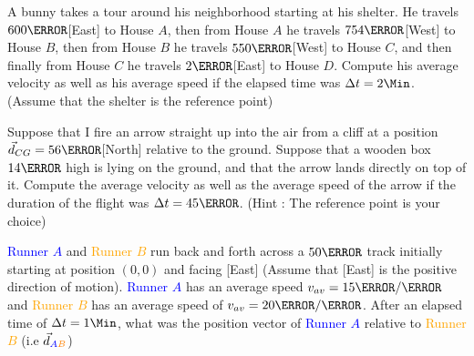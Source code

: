 \documentclass[12pt]{article} %
\begin{document}
\begin{qstn}[9]
A bunny takes a tour around his neighborhood starting at his shelter. He travels $600\m$[East] to House $A$, then from House $A$ he travels $754\m$[West] to House $B$, then from House $B$ he travels $550 \m$[West] to House $C$, and then finally from House $C$ he travels $2\km$[East] to House $D$. Compute his average velocity as well as his average speed if the elapsed time was $\Delta t = 2\Min$. (Assume that the shelter is the reference point)
\end{qstn}

\begin{qstn}[10]
Suppose that I fire an arrow straight up into the air from a cliff at a position $\vec d_{CG} = 56\m$[North] relative to the ground. Suppose that a wooden box $14\m$ high is lying on the ground, and that the arrow lands directly on top of it. Compute the average velocity as well as the average speed of the arrow if the duration of the flight was $\Delta t = 45\s$. (Hint : The reference point is your choice)
\end{qstn}

\begin{qstn}[11]
	\textcolor{blue}{Runner $A$} and \textcolor{orange}{Runner $B$} run back and forth across a $50\m$ track initially starting at position $(0,0)$ and facing [East] (Assume that [East] is the positive direction of motion). \textcolor{blue}{Runner $A$} has an average speed \textcolor{blue}{$v_{av} = 15 \m / \s$} and \textcolor{orange}{Runner $B$} has an average speed of \textcolor{orange}{$v_{av} = 20 \m / \s$}. After an elapsed time of $\Delta t = 1\Min$, what was the position vector of \textcolor{blue}{Runner $A$} relative to \textcolor{orange}{Runner $B$} (i.e $\vec d_{\textcolor{blue}{A}\textcolor{orange}{B}}$) 

\end{qstn}
\end{document}
